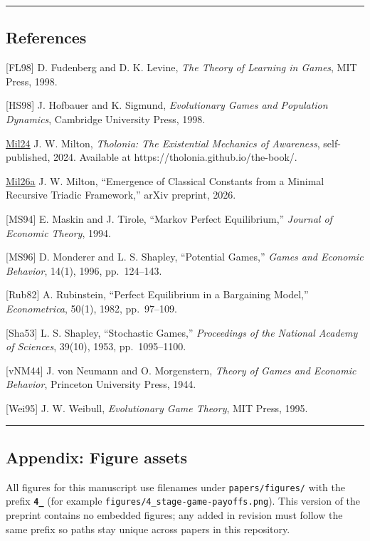 \documentclass[
  11pt,
  letterpaper,
]{article}
\begin{document}
\begin{center}\rule{0.5\linewidth}{0.5pt}\end{center}

\subsection{References}\label{references}

{[}FL98{]} D. Fudenberg and D. K. Levine, \emph{The Theory of Learning
in Games}, MIT Press, 1998.

{[}HS98{]} J. Hofbauer and K. Sigmund, \emph{Evolutionary Games and
Population Dynamics}, Cambridge University Press, 1998.

\href{https://tholonia.github.io/the-book/}{Mil24} J. W. Milton,
\emph{Tholonia: The Existential Mechanics of Awareness}, self-published,
2024. Available at https://tholonia.github.io/the-book/.

\href{https://github.com/baardev/truevalue/blob/main/docnav/Research/papers/1_recursive-tholonic-five-constants/1_recursive-tholonic-five-constants.pdf}{Mil26a}
J. W. Milton, ``Emergence of Classical Constants from a Minimal
Recursive Triadic Framework,'' arXiv preprint, 2026.

{[}MS94{]} E. Maskin and J. Tirole, ``Markov Perfect Equilibrium,''
\emph{Journal of Economic Theory}, 1994.

{[}MS96{]} D. Monderer and L. S. Shapley, ``Potential Games,''
\emph{Games and Economic Behavior}, 14(1), 1996, pp.~124--143.

{[}Rub82{]} A. Rubinstein, ``Perfect Equilibrium in a Bargaining
Model,'' \emph{Econometrica}, 50(1), 1982, pp.~97--109.

{[}Sha53{]} L. S. Shapley, ``Stochastic Games,'' \emph{Proceedings of
the National Academy of Sciences}, 39(10), 1953, pp.~1095--1100.

{[}vNM44{]} J. von Neumann and O. Morgenstern, \emph{Theory of Games and
Economic Behavior}, Princeton University Press, 1944.

{[}Wei95{]} J. W. Weibull, \emph{Evolutionary Game Theory}, MIT Press,
1995.

\begin{center}\rule{0.5\linewidth}{0.5pt}\end{center}

\subsection{Appendix: Figure assets}\label{appendix-figure-assets}

All figures for this manuscript use filenames under
\texttt{papers/figures/} with the prefix \textbf{\texttt{4\_}} (for
example \texttt{figures/4\_stage-game-payoffs.png}). This version of the
preprint contains no embedded figures; any added in revision must follow
the same prefix so paths stay unique across papers in this repository.
\end{document}
